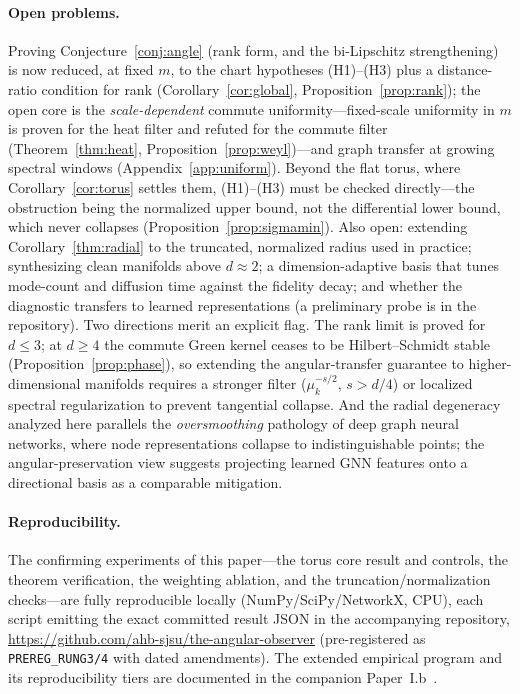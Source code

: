 \documentclass[11pt]{article}
\theoremstyle{remark}
\begin{document}
\paragraph{Open problems.} Proving Conjecture~\ref{conj:angle} (rank form, and the
bi-Lipschitz strengthening) is now reduced, at fixed $m$, to the chart hypotheses
(H1)--(H3) plus a distance-ratio condition for rank (Corollary~\ref{cor:global},
Proposition~\ref{prop:rank}); the open core is the \emph{scale-dependent} commute
uniformity---fixed-scale uniformity in $m$ is proven for the heat filter and
refuted for the commute filter (Theorem~\ref{thm:heat},
Proposition~\ref{prop:weyl})---and graph transfer at growing spectral windows
(Appendix~\ref{app:uniform}). Beyond the flat torus, where
Corollary~\ref{cor:torus} settles them, (H1)--(H3) must be checked directly---the
obstruction being the normalized upper bound, not the differential lower bound,
which never collapses (Proposition~\ref{prop:sigmamin}). Also open: extending Corollary~\ref{thm:radial} to
the truncated, normalized radius used in practice; synthesizing clean manifolds
above $d\approx2$; a dimension-adaptive basis that tunes mode-count and diffusion
time against the fidelity decay; and whether the diagnostic transfers to learned
representations (a preliminary probe is in the repository). Two directions merit an
explicit flag. The rank limit is proved for $d\le3$; at $d\ge4$ the commute Green
kernel ceases to be Hilbert--Schmidt stable (Proposition~\ref{prop:phase}), so
extending the angular-transfer guarantee to higher-dimensional manifolds requires a
stronger filter ($\mu_k^{-s/2}$, $s>d/4$) or localized spectral regularization to
prevent tangential collapse. And the radial degeneracy analyzed here parallels the
\emph{oversmoothing} pathology of deep graph neural networks, where node
representations collapse to indistinguishable points; the angular-preservation view
suggests projecting learned GNN features onto a directional basis as a comparable
mitigation.

\paragraph{Reproducibility.} The confirming experiments of this paper---the torus
core result and controls, the theorem verification, the weighting ablation, and the
truncation/normalization checks---are fully reproducible locally
(NumPy/SciPy/NetworkX, CPU), each script emitting the exact committed result JSON in
the accompanying repository, \url{https://github.com/ahb-sjsu/the-angular-observer}
(pre-registered as \texttt{PREREG\_RUNG3/4} with dated amendments). The extended
empirical program and its reproducibility tiers are documented in the companion
Paper~I.b~\cite{paperIb}.
\end{document}
